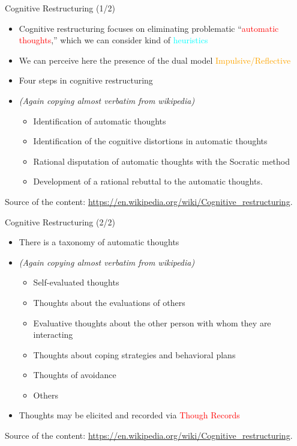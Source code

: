 \documentclass{beamer}
\begin{document}
\begin{frame}
{\centerline{Cognitive Restructuring (1/2)}}

\begin{itemize}
\item Cognitive restructuring focuses on eliminating problematic ``\textcolor{red}{automatic thoughts},'' which we can consider kind of \textcolor{cyan}{heuristics}
\item We can perceive here the presence of the dual model \textcolor{orange}{Impulsive/Reflective}
\item Four steps in cognitive restructuring
\item \textit{(Again copying almost verbatim from wikipedia)}
\begin{itemize}
\item Identification of automatic thoughts
\item Identification of the cognitive distortions in automatic thoughts
\item Rational disputation of automatic thoughts with the Socratic method
\item Development of a rational rebuttal to the automatic thoughts.
\end{itemize} 
\end{itemize} 

\begin{center}
\tiny
Source of the content: \url{https://en.wikipedia.org/wiki/Cognitive_restructuring}.
\end{center}

\end{frame}

\begin{frame}
{\centerline{Cognitive Restructuring (2/2)}}

\begin{itemize}
\item There is a taxonomy of automatic thoughts
\item \textit{(Again copying almost verbatim from wikipedia)}
\begin{itemize}
\item Self-evaluated thoughts
\item Thoughts about the evaluations of others
\item Evaluative thoughts about the other person with whom they are interacting
\item Thoughts about coping strategies and behavioral plans
\item Thoughts of avoidance
\item Others
\end{itemize} 
\item Thoughts may be elicited and recorded via \textcolor{red}{Though Records}
\end{itemize} 

\begin{center}
\tiny
Source of the content: \url{https://en.wikipedia.org/wiki/Cognitive_restructuring}.
\end{center}

\end{frame}
\end{document}
